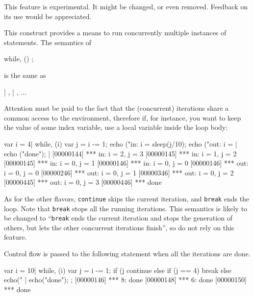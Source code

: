 \begin{note}
  This feature is experimental.  It might be changed, or even removed.
  Feedback on its use would be appreciated.
\end{note}

This construct provides a means to run concurrently multiple instances
of statements.  The semantics of

\begin{urbiunchecked}[frame=, backgroundcolor=, ]
while, ()
  ;
\end{urbiunchecked}

\noindent
is the same as

\begin{urbiunchecked}[frame=, backgroundcolor=, ]
 |  ,  |  , ...
\end{urbiunchecked}

Attention must be paid to the fact that the (concurrent) iterations
share a common access to the environment, therefore if, for instance,
you want to keep the value of some index variable, use a local
variable inside the loop body:

\begin{urbiscript}
{
  var i = 4|
  while, (i)
  {
    var j = i -= 1;
    echo ("in: i = %
    sleep(j/10);
    echo ("out: i = %
  }|
  echo ("done");
}|
[00000144] *** in: i = 2, j = 3
[00000145] *** in: i = 1, j = 2
[00000145] *** in: i = 0, j = 1
[00000146] *** in: i = 0, j = 0
[00000146] *** out: i = 0, j = 0
[00000246] *** out: i = 0, j = 1
[00000346] *** out: i = 0, j = 2
[00000445] *** out: i = 0, j = 3
[00000446] *** done
\end{urbiscript}

As for the other flavors, \lstinline|continue| skips the current
iteration, and \lstinline|break| ends the loop.  Note that
\lstinline|break| stops all the running iterations.  This semantics is
likely to be changed to ``\lstinline|break| ends the current iteration
and stops the generation of others, but lets the other concurrent
iterations finish'', so do not rely on this feature.

Control flow is passed to the following statement when all the
iterations are done.

\begin{urbiscript}[firstnumber=last]
{
  var i = 10|
  while, (i)
  {
    var j = i -= 1;
    if (j %
      continue
    else if (j == 4)
      break
    else
      echo("%
  }|
  echo("done");
};
[00000146] *** 8: done
[00000148] *** 6: done
[00000150] *** done
\end{urbiscript}


